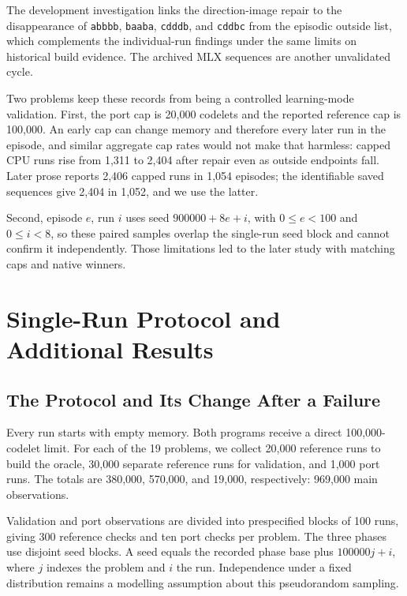 \documentclass[10pt,letterpaper]{article}
\begin{document}
The development investigation links the direction-image repair to the disappearance of
\texttt{abbbb}, \texttt{baaba}, \texttt{cdddb}, and \texttt{cddbc} from the episodic
outside list, which complements the individual-run findings under the same limits on
historical build evidence. The archived MLX sequences are another unvalidated cycle.

Two problems keep these records from being a controlled learning-mode validation. First,
the port cap is 20,000 codelets and the reported reference cap is 100,000. An early cap
can change memory and therefore every later run in the episode, and similar aggregate cap
rates would not make that harmless: capped CPU runs rise from 1,311 to 2,404 after repair
even as outside endpoints fall. Later prose reports 2,406 capped runs in 1,054 episodes;
the identifiable saved sequences give 2,404 in 1,052, and we use the latter.

Second, episode \(e\), run \(i\) uses seed \(900000+8e+i\), with \(0\le e<100\) and
\(0\le i<8\), so these paired samples overlap the single-run seed block and cannot confirm
it independently. Those limitations led to the later study with matching caps and native
winners.

\clearpage

\section{Single-Run Protocol and Additional Results}\label{app:single-study}

\subsection{The Protocol and Its Change After a Failure}\label{sec:single-protocol}

Every run starts with empty memory. Both programs receive a direct 100,000-codelet limit.
For each of the 19 problems, we collect 20,000 reference runs to build the oracle, 30,000
separate reference runs for validation, and 1,000 port runs. The totals are 380,000,
570,000, and 19,000, respectively: 969,000 main observations.

Validation and port observations are divided into prespecified blocks of 100 runs, giving
300 reference checks and ten port checks per problem. The three phases use disjoint seed
blocks. A seed equals the recorded phase base plus \(100000j+i\), where \(j\) indexes the
problem and \(i\) the run. Independence under a fixed distribution remains a modelling
assumption about this pseudorandom sampling.
\end{document}
